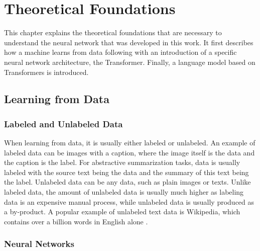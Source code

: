 \chapter{Theoretical Foundations}\label{ch:theoretical-foundations}

This chapter explains the theoretical foundations that are necessary to understand the neural network that was developed in this work.
It first describes how a machine learns from data following with an introduction of a specific neural network architecture, the Transformer.
Finally, a language model based on Transformers is introduced.


\section{Learning from Data}

\subsection{Labeled and Unlabeled Data}

When learning from data, it is usually either labeled or unlabeled.
An example of labeled data can be images with a caption, where the image itself is the data and the caption is the label.
For abstractive summarization tasks, data is usually labeled with the source text being the data and the summary of this text being the label.
Unlabeled data can be any data, such as plain images or texts.
Unlike labeled data, the amount of unlabeled data is usually much higher as labeling data is an expensive manual process, while unlabeled data is usually produced as a by-product.
A popular example of unlabeled text data is Wikipedia, which contains over a billion words in English alone \cite{wikipediaStats}. 


\subsection{Neural Networks}

